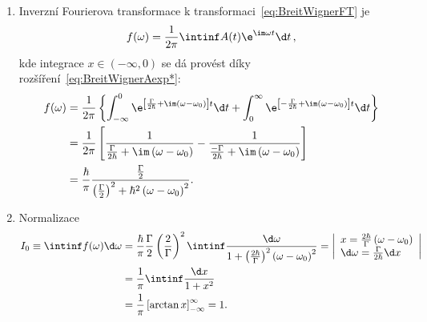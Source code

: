 \begin{solution}
\begin{enumerate}
	\item
		Inverzní Fourierova transformace k transformaci~\eqref{eq:BreitWignerFT} je		
		\begin{equation}
			f(\omega)=\frac{1}{2\pi}\intinf A(t)\e^{\im\omega t}\d t\,,
		\end{equation}
		kde integrace $x\in(-\infty,0)$ se dá provést díky rozšíření~\eqref{eq:BreitWignerAexp*}:
		\begin{align}
			f(\omega)
				&=\frac{1}{2\pi}\left\{\int_{-\infty}^{0}\e^{\left[\frac{\Gamma}{2\hbar}+\im\left(\omega-\omega_{0}\right)\right]t}\d t
					+\int_{0}^{\infty}\e^{\left[-\frac{\Gamma}{2\hbar}+\im\left(\omega-\omega_{0}\right)\right]t}\d t\right\}\nonumber\\
				&=\frac{1}{2\pi}\left[\frac{1}{\frac{\Gamma}{2\hbar}+\im\left(\omega-\omega_{0}\right)}-\frac{1}{\frac{-\Gamma}{2\hbar}+\im\left(\omega-\omega_{0}\right)}\right]\nonumber\\
				&=\frac{\hbar}{\pi}\frac{\frac{\Gamma}{2}}{\left(\frac{\Gamma}{2}\right)^{2}+\hbar^{2}\left(\omega-\omega_{0}\right)^{2}}.
		\end{align}
		
	\item
		Normalizace
		\begin{align}
			I_{0}\equiv\intinf f(\omega)\d\omega
				&=\frac{\hbar}{\pi}\frac{\Gamma}{2}\left(\frac{2}{\Gamma}\right)^{2}\intinf\frac{\d\omega}{1+\left(\frac{2\hbar}{\Gamma}\right)^{2}\left(\omega-\omega_{0}\right)^{2}}
				 =\left|\begin{array}{l}x=\frac{2\hbar}{\Gamma}\left(\omega-\omega_{0}\right) \\ \d\omega=\frac{\Gamma}{2\hbar}\d x\end{array}\right|\nonumber\\
				&=\frac{1}{\pi}\intinf\frac{\d x}{1+x^{2}}\nonumber\\
				&=\frac{1}{\pi}\left[\arctan{x}\right]_{-\infty}^{\infty}=1.
		\end{align}
		

\end{enumerate}
\end{solution}

